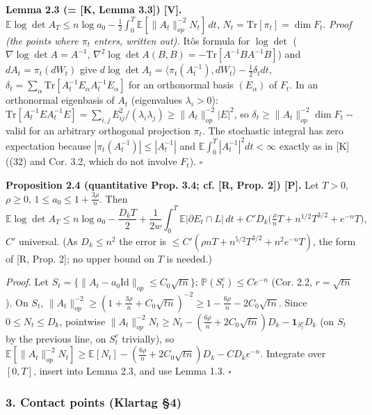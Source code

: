 \textbf{Lemma 2.3 (= {[}K, Lemma 3.3{]}) {[}V{]}.} \(\mathbb E\log\det A_T\le n\log a_0-\frac12\int_0^T\mathbb E[\|A_t\|_{op}^{-2}N_t]\,dt\), \(N_t=\mathrm{Tr}[\pi_t]=\dim F_t\).
\emph{Proof (the points where \(\pi_t\) enters, written out).} Itô\textquotesingle s formula for \(\log\det\) (\(\nabla\log\det A=A^{-1}\), \(\nabla^2\log\det A(B,B)=-\mathrm{Tr}[A^{-1}BA^{-1}B]\)) and \(dA_t=\pi_t(dW_t)\) give \(d\log\det A_t=\langle\pi_t(A_t^{-1}),dW_t\rangle-\frac12\delta_tdt\), \(\delta_t=\sum_\alpha\mathrm{Tr}[A_t^{-1}E_\alpha A_t^{-1}E_\alpha]\) for an orthonormal basis \((E_\alpha)\) of \(F_t\). In an orthonormal eigenbasis of \(A_t\) (eigenvalues \(\lambda_i>0\)): \(\mathrm{Tr}[A_t^{-1}EA_t^{-1}E]=\sum_{i,j}E_{ij}^2/(\lambda_i\lambda_j)\ge\|A_t\|_{op}^{-2}|E|^2\), so \(\delta_t\ge\|A_t\|_{op}^{-2}\dim F_t\) -\/- valid for an arbitrary orthogonal projection \(\pi_t\). The stochastic integral has zero expectation because \(|\pi_t(A_t^{-1})|\le|A_t^{-1}|\) and \(\mathbb E\int_0^T|A_t^{-1}|^2dt<\infty\) exactly as in {[}K{]} ((32) and Cor. 3.2, which do not involve \(F_t\)). \(\square\)

\textbf{Proposition 2.4 (quantitative Prop. 3.4; cf. {[}R, Prop. 2{]}) {[}P{]}.} Let \(T>0\), \(\rho\ge0\), \(1\le a_0\le1+\frac{3\rho}n\). Then
\[\mathbb E\log\det A_T\le n\log a_0-\frac{D_kT}2+\frac1{2w}\int_0^T\mathbb E|\partial E_t\cap L|\,dt+C'D_k\big(\tfrac{\rho}{n}T+n^{1/2}T^{3/2}+e^{-n}T\big),\]
\(C'\) universal. (As \(D_k\le n^2\) the error is \(\le C'(\rho nT+n^{5/2}T^{3/2}+n^2e^{-n}T)\), the form of {[}R, Prop. 2{]}; no upper bound on \(T\) is needed.)

\emph{Proof.} Let \(S_t=\{\|A_t-a_0\mathrm{Id}\|_{op}\le C_0\sqrt{tn}\}\); \(\mathbb P(S_t^c)\le Ce^{-n}\) (Cor. 2.2, \(r=\sqrt{tn}\)). On \(S_t\),
\(\|A_t\|_{op}^{-2}\ge(1+\frac{3\rho}n+C_0\sqrt{tn})^{-2}\ge1-\frac{6\rho}n-2C_0\sqrt{tn}\). Since \(0\le N_t\le D_k\), pointwise \(\|A_t\|_{op}^{-2}N_t\ge N_t-(\frac{6\rho}n+2C_0\sqrt{tn})D_k-\mathbf 1_{S_t^c}D_k\) (on \(S_t\) by the previous line, on \(S_t^c\) trivially), so
\(\mathbb E[\|A_t\|_{op}^{-2}N_t]\ge\mathbb E[N_t]-(\frac{6\rho}n+2C_0\sqrt{tn})D_k-CD_ke^{-n}\). Integrate over \([0,T]\), insert into Lemma 2.3, and use Lemma 1.3. \(\square\)

\hypertarget{contact-points-klartag-4}{%
\subsubsection*{3. Contact points (Klartag §4)}\label{contact-points-klartag-4}}

